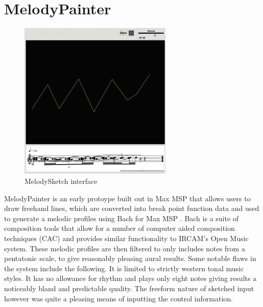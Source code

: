 \documentclass[12pt]{report}
\begin{document}
\section{MelodyPainter}
\label{sec:org890ff4f}
\begin{LATEX}
\begin{figure}[h]
\centering
\includegraphics[width=0.65\textwidth]{./assets/melodysketch.png}
\caption{MelodySketch interface}
\label{fig:melodysketch}
\end{figure}
\label{orgaa063c0}
\end{LATEX}
MelodyPainter is an early protoype built out in Max MSP that allows users to
draw freehand lines, which are converted into break point function data and used
to generate a melodic profiles using Bach for Max MSP \cite{agostini_max_2015}.
Bach is a suite of composition tools that allow for a number of computer aided
composition techniques (CAC) and provides similar functionality to IRCAM's Open
Music system. These melodic profiles are then filtered to only includes notes
from a pentatonic scale, to give reasonably pleasing aural results. Some notable
flaws in the system include the following. It is limited to strictly western
tonal music styles. It has no allowance for rhythm and plays only eight notes
giving results a noticeably bland and predictable quality. The freeform nature
of sketched input however was quite a pleasing means of inputting the control
information.
\end{document}
